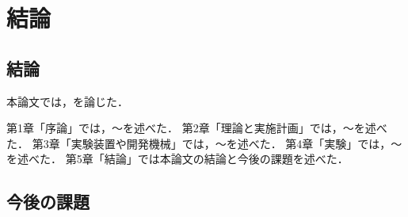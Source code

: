 ﻿%

\chapter{結論}\label{chapter:結論}

\section{結論}

本論文では，を論じた．

第1章「序論」では，～を述べた．
第2章「理論と実施計画」では，～を述べた．
第3章「実験装置や開発機械」では，～を述べた．
第4章「実験」では，～を述べた．
第5章「結論」では本論文の結論と今後の課題を述べた．

\section{今後の課題}
